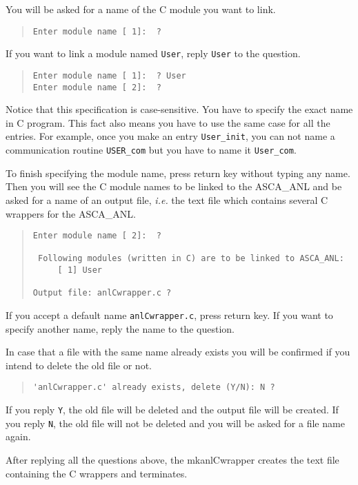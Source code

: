 You will be asked for a name of the C module you want to link.
%
\begin{quote}\baselineskip 3.2mm\begin{verbatim}
Enter module name [ 1]:  ?
\end{verbatim}\end{quote}
%
If you want to link a module named {\tt User},
reply {\tt User} to the question.
%
\begin{quote}\baselineskip 3.2mm\begin{verbatim}
Enter module name [ 1]:  ? User
Enter module name [ 2]:  ?
\end{verbatim}\end{quote}
%
Notice
that this specification is case-sensitive.
You have to specify the exact name in C program.
This fact also means
you have to use the same case for all the entries.
For example,
once you make an entry {\tt User\_init},
you can not name a communication routine {\tt USER\_com}
but you have to name it {\tt User\_com}.

To finish specifying the module name,
press return key without typing any name.
Then you will see the C module names to be linked to the  
ASCA\_ANL
and be asked for a name of an output file,
{\em i.e.}
the text file which contains several C wrappers for the ASCA\_ANL.
%
\begin{quote}\baselineskip 3.2mm\begin{verbatim}
Enter module name [ 2]:  ?

 Following modules (written in C) are to be linked to ASCA_ANL:
     [ 1] User

Output file: anlCwrapper.c ?
\end{verbatim}\end{quote}
%
If you accept a default name {\tt anlCwrapper.c},
press return key.
If you want to specify another name,
reply the name to the question.

In case that a file with the same name already exists
you will be confirmed if you intend to delete the old file or not.
%
\begin{quote}\baselineskip 3.2mm\begin{verbatim}
'anlCwrapper.c' already exists, delete (Y/N): N ?
\end{verbatim}\end{quote}
%
If you reply {\tt Y},
the old file will be deleted and the output file will be created.
If you reply {\tt N},
the old file will not be deleted and you will be asked for a file  
name again.

After replying all the questions above,
the mkanlCwrapper creates the text file containing the C wrappers
and terminates.
